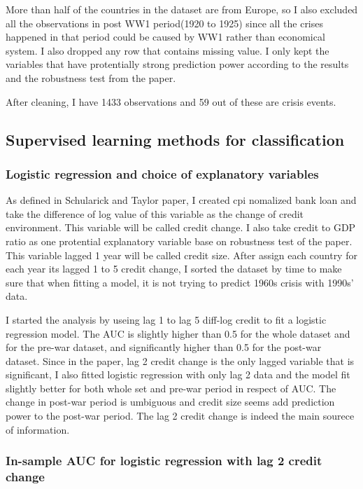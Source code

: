 \documentclass{article}
\begin{document}
More than half of the countries in the dataset are from
Europe, so I also excluded all the observations in post WW1 period(1920 to
1925) since all the crises happened in
that period could be caused by WW1 rather than economical system. I also
dropped any row that contains missing value. I
only kept the variables that have protentially strong prediction power
according to the results and the robustness test from the paper.

After cleaning, I have 1433 observations and 59 out of these are crisis
events.

\subsection*{Supervised learning methods for classification}

\subsubsection*{Logistic regression and choice of explanatory variables}

As defined in Schularick and Taylor paper, I created cpi nomalized bank
loan and take the difference of log value of this variable as the change
of credit environment. This variable will be called credit change. I also
take credit to GDP ratio as one protential
explanatory variable base on robustness test of the paper. This variable
lagged 1 year will be called credit size. After
assign each country for each year its lagged 1 to 5 credit change, I
sorted the dataset by time to make sure that when fitting a model, it is
not trying to predict 1960s crisis with 1990s' data.

I started the analysis by useing lag 1 to lag 5 diff-log credit to fit a
logistic regression model. The AUC is slightly higher than 0.5 for the whole
dataset and for the pre-war dataset, and significantly higher than 0.5
for the post-war dataset. Since in the paper, lag 2 credit change is the only lagged variable that
is significant, I also fitted logistic regression with only lag 2 data
and the model fit slightly better for both whole set and pre-war period
in respect of AUC. The change in post-war period is umbiguous and 
credit size seems add prediction power to the post-war period. The lag 2 credit change is indeed the
main sourece of information.

\subsubsection*{In-sample AUC for logistic regression with lag 2 credit change}
\end{document}
